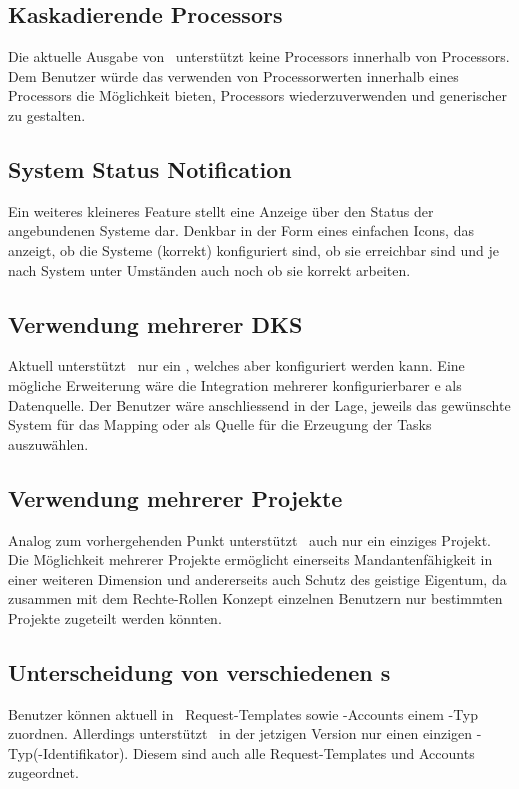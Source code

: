 			
		\subsection{Kaskadierende Processors}
			Die aktuelle Ausgabe von \eeppi\ unterstützt keine Processors innerhalb von Processors.
			Dem Benutzer würde das verwenden von Processorwerten innerhalb eines Processors die Möglichkeit bieten, Processors wiederzuverwenden und generischer zu gestalten.
			
			
		\subsection{System Status Notification}
			Ein weiteres kleineres Feature stellt eine Anzeige über den Status der angebundenen Systeme dar.
			Denkbar in der Form eines einfachen Icons, das anzeigt, 
			ob die Systeme (korrekt) konfiguriert sind, ob sie erreichbar sind
			und je nach System unter Umständen auch noch ob sie korrekt arbeiten.		
		
		
	
		\subsection{Verwendung mehrerer DKS}
			Aktuell unterstützt \eeppi\ nur ein \dks, welches aber konfiguriert werden kann.
			Eine mögliche Erweiterung wäre die Integration mehrerer konfigurierbarer \dks e als Datenquelle.
			Der Benutzer wäre anschliessend in der Lage, jeweils das gewünschte System für das Mapping oder als Quelle für die Erzeugung der Tasks auszuwählen.
		
		
		\subsection{Verwendung mehrerer Projekte}
			Analog zum vorhergehenden Punkt unterstützt \eeppi\ auch nur ein einziges Projekt.
			Die Möglichkeit mehrerer Projekte ermöglicht einerseits Mandantenfähigkeit in einer weiteren Dimension und andererseits auch Schutz des geistige Eigentum, 
			da zusammen mit dem Rechte-Rollen Konzept einzelnen Benutzern nur bestimmten Projekte zugeteilt werden könnten.


		\subsection{Unterscheidung von verschiedenen \ppt s}
			Benutzer können aktuell in \eeppi\ Request-Templates sowie \ppt-Accounts einem \ppt-Typ zuordnen.
			Allerdings unterstützt \eeppi\ in der jetzigen Version nur einen einzigen \ppt-Typ(-Identifikator).
			Diesem sind auch alle Request-Templates und Accounts zugeordnet.
			
